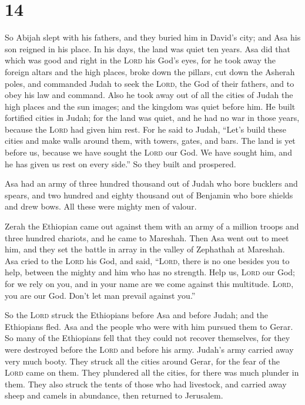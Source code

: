 \hypertarget{section-13}{%
\section{14}\label{section-13}}

 So Abijah slept with his fathers, and they buried him in
David's city; and Asa his son reigned in his place. In his days, the
land was quiet ten years.  Asa did that which was good and
right in the \textsc{Lord} his God's eyes,  for he took
away the foreign altars and the high places, broke down the pillars, cut
down the Asherah poles,  and commanded Judah to seek the
\textsc{Lord}, the God of their fathers, and to obey his law and
command.  Also he took away out of all the cities of Judah
the high places and the sun images; and the kingdom was quiet before
him.  He built fortified cities in Judah; for the land was
quiet, and he had no war in those years, because the \textsc{Lord} had
given him rest.  For he said to Judah, ``Let's build these
cities and make walls around them, with towers, gates, and bars. The
land is yet before us, because we have sought the \textsc{Lord} our God.
We have sought him, and he has given us rest on every side.'' So they
built and prospered.

 Asa had an army of three hundred thousand out of Judah
who bore bucklers and spears, and two hundred and eighty thousand out of
Benjamin who bore shields and drew bows. All these were mighty men of
valour.

 Zerah the Ethiopian came out against them with an army of
a million troops and three hundred chariots, and he came to Mareshah.
 Then Asa went out to meet him, and they set the battle
in array in the valley of Zephathah at Mareshah.  Asa
cried to the \textsc{Lord} his God, and said, ``\textsc{Lord}, there is
no one besides you to help, between the mighty and him who has no
strength. Help us, \textsc{Lord} our God; for we rely on you, and in
your name are we come against this multitude. \textsc{Lord}, you are our
God. Don't let man prevail against you.''

 So the \textsc{Lord} struck the Ethiopians before Asa
and before Judah; and the Ethiopians fled.  Asa and the
people who were with him pursued them to Gerar. So many of the
Ethiopians fell that they could not recover themselves, for they were
destroyed before the \textsc{Lord} and before his army. Judah's army
carried away very much booty.  They struck all the cities
around Gerar, for the fear of the \textsc{Lord} came on them. They
plundered all the cities, for there was much plunder in them.
 They also struck the tents of those who had livestock,
and carried away sheep and camels in abundance, then returned to
Jerusalem.


